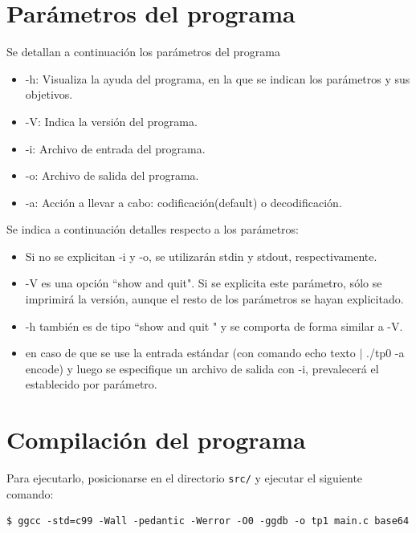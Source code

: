 \documentclass[11pt,a4paper]{article}
\begin{document}
\begin{itemize}
\begin{itemize}
	\end{itemize}

	\end{itemize}


\section{Parámetros del programa}

Se detallan a continuación los parámetros del programa

\begin{itemize}
    \item -h: Visualiza la ayuda del programa, en la que se indican los parámetros y sus objetivos.
    \item -V: Indica la versión del programa.
    \item -i: Archivo de entrada del programa.
    \item -o: Archivo de salida del programa.
    \item -a: Acción a llevar a cabo: codificación(default) o decodificación.
\end{itemize}

Se indica a continuación detalles respecto a los parámetros:

\begin{itemize}
    \item Si no se explicitan -i y -o, se utilizarán stdin y stdout, respectivamente. 
    \item -V es una opción ``show and quit". Si se explicita este parámetro, sólo se imprimirá la versión, aunque el resto de los parámetros se hayan explicitado. 
    \item -h también es de tipo ``show and quit " y se comporta de forma similar a -V.
    \item en caso de que se use la entrada estándar (con comando echo texto $|$ ./tp0 -a encode) y luego se especifique un archivo de salida con -i, prevalecerá el establecido por parámetro.
\end{itemize}

\section{Compilación del programa}

Para ejecutarlo, posicionarse en el directorio \texttt{src/} y ejecutar el siguiente comando:
\begin{lstlisting}
$ ggcc -std=c99 -Wall -pedantic -Werror -O0 -ggdb -o tp1 main.c base64
\end{lstlisting}
\end{document}
